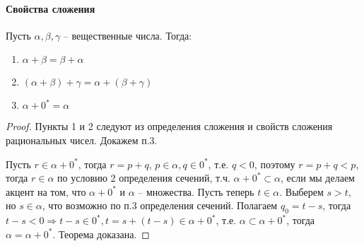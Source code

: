 \documentclass[main]{subfiles}
\begin{document}
\paragraph{Свойства сложения}
\begin{theorem}
    Пусть $\alpha, \beta, \gamma$ -- вещественные числа. Тогда:
    \begin{enumerate}
        \item $\alpha + \beta = \beta + \alpha$
        \item $(\alpha + \beta) + \gamma = \alpha + (\beta + \gamma)$
        \item $\alpha + 0^* = \alpha$
    \end{enumerate}
\end{theorem}
\begin{proof}
    Пункты 1 и 2 следуют из определения сложения и свойств сложения
    рациональных чисел. Докажем п.3.

    Пусть $r \in \alpha + 0^*$, тогда $r = p + q$, $p \in \alpha, q \in 0^*$,
    т.е. $q < 0$, поэтому $r = p + q < p$, тогда $r \in \alpha$ по условию 2 
    определения сечений, т.ч. $\alpha + 0^* \subset \alpha$, если мы делаем 
    акцент на том, что $\alpha + 0^*$ и $\alpha$ -- множества. Пусть теперь
    $t \in \alpha$. Выберем $s > t$, но $s \in \alpha$, что возможно по п.3
    определения сечений. Полагаем $q_0 = t - s$, тогда $t - s < 0 \Rightarrow
    t - s \in 0^*, t = s + (t - s) \in \alpha + 0^*$, т.е. $\alpha \subset 
    \alpha + 0^*$, тогда $\alpha = \alpha + 0^*$. Теорема доказана.
\end{proof}
\end{document}
